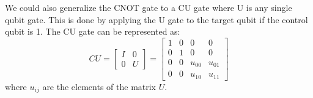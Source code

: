 \documentclass[reqno]{amsart}
\numberwithin{equation}{section}
\numberwithin{figure}{section}
\begin{document}
\begin{justify}
We could also generalize the CNOT gate to a CU gate where U is any single qubit gate. This is done by applying the U gate to the target qubit if the control qubit is 1. The CU gate can be represented as:
    \begin{equation}
        CU = \begin{bmatrix}
                I & 0 \\
                0 & U
            \end{bmatrix} = \begin{bmatrix}
                                1 & 0 & 0 & 0 \\
                                0 & 1 & 0 & 0 \\
                                0 & 0 & u_{00} & u_{01} \\
                                0 & 0 & u_{10} & u_{11}
                            \end{bmatrix}
    \end{equation}
where $u_{ij}$ are the elements of the matrix $U$. \\


\end{justify}
\end{document}
